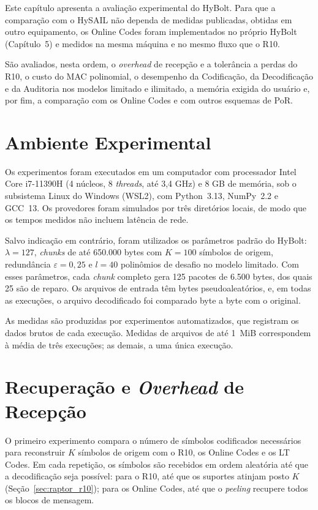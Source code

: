 Este capítulo apresenta a avaliação experimental do HyBolt. Para que a comparação com o HySAIL \cite{amaral2013hysail,amaral2019hysail} não dependa de medidas publicadas, obtidas em outro equipamento, os Online Codes foram implementados no próprio HyBolt (Capítulo~5) e medidos na mesma máquina e no mesmo fluxo que o R10.

São avaliados, nesta ordem, o \emph{overhead} de recepção e a tolerância a perdas do R10, o custo do \acrshort{MAC} polinomial, o desempenho da Codificação, da Decodificação e da Auditoria nos modelos limitado e ilimitado, a memória exigida do usuário e, por fim, a comparação com os Online Codes e com outros esquemas de \acrshort{PoR}.

\section{Ambiente Experimental}
\label{sec:ambiente_experimental}

Os experimentos foram executados em um computador com processador Intel Core i7-11390H (4 núcleos, 8 \emph{threads}, até 3,4 GHz) e 8 GB de memória, sob o subsistema Linux do Windows (WSL2), com Python~3.13, NumPy~2.2 e GCC~13. Os provedores foram simulados por três diretórios locais, de modo que os tempos medidos não incluem latência de rede.

Salvo indicação em contrário, foram utilizados os parâmetros padrão do HyBolt: $\lambda = 127$, \emph{chunks} de até 650.000 bytes com $K = 100$ símbolos de origem, redundância $\varepsilon = 0{,}25$ e $l = 40$ polinômios de desafio no modelo limitado. Com esses parâmetros, cada \emph{chunk} completo gera 125 pacotes de 6.500 bytes, dos quais 25 são de reparo. Os arquivos de entrada têm bytes pseudoaleatórios, e, em todas as execuções, o arquivo decodificado foi comparado byte a byte com o original.

As medidas são produzidas por experimentos automatizados, que registram os dados brutos de cada execução. Medidas de arquivos de até 1~MiB correspondem à média de três execuções; as demais, a uma única execução.

\section{Recuperação e \emph{Overhead} de Recepção}
\label{sec:resultados_overhead}

O primeiro experimento compara o número de símbolos codificados necessários para reconstruir $K$ símbolos de origem com o R10, os Online Codes e os LT Codes. Em cada repetição, os símbolos são recebidos em ordem aleatória até que a decodificação seja possível: para o R10, até que os suportes atinjam posto $K$ (Seção~\ref{sec:raptor_r10}); para os Online Codes, até que o \emph{peeling} recupere todos os blocos de mensagem.

